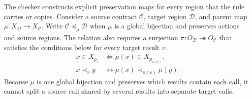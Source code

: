 The checker constructs explicit preservation maps for every region that the rule carries or copies.
Consider a source contract \(\mathcal C\), target region \(\mathcal D\), and parent map \(\mu:X_{\mathcal D}\to X_{\mathcal C}\).
Write \(\mathcal C\preccurlyeq_\mu\mathcal D\) when \(\mu\) is a global bijection and preserves actions and source regions.
The relation also requires a surjection \(\pi:O_{\mathcal D}\twoheadrightarrow O_{\mathcal C}\) that satisfies the conditions below for every target result \(v\).
\[
\begin{aligned}
 x\in X_{p_v}
   &\Longleftrightarrow \mu(x)\in X_{p_{\pi(v)}},\\
 x\prec_v y
   &\Longleftrightarrow \mu(x)\prec_{\pi(v)}\mu(y).
\end{aligned}
\]
Because \(\mu\) is one global bijection and preserves which results contain each call, it cannot split a source call shared by several results into separate target calls.

